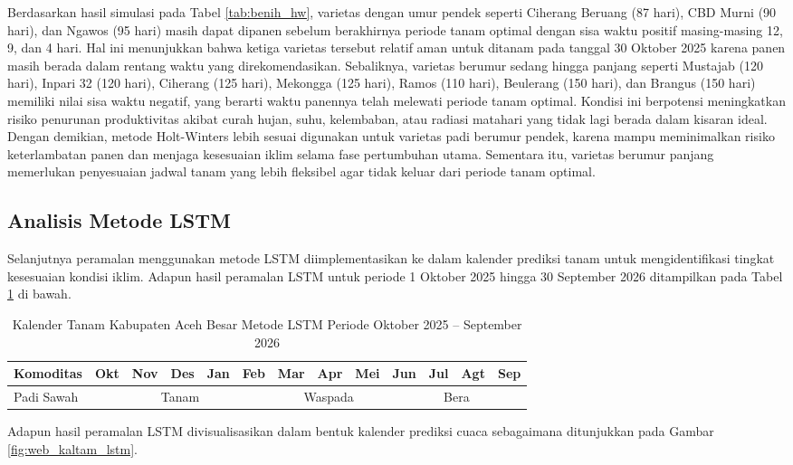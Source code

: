 Berdasarkan hasil simulasi pada Tabel \ref{tab:benih_hw}, varietas dengan umur pendek seperti Ciherang Beruang (87 hari), CBD Murni (90 hari), dan Ngawos (95 hari) masih dapat dipanen sebelum berakhirnya periode tanam optimal dengan sisa waktu positif masing-masing 12, 9, dan 4 hari. Hal ini menunjukkan bahwa ketiga varietas tersebut relatif aman untuk ditanam pada tanggal 30 Oktober 2025 karena panen masih berada dalam rentang waktu yang direkomendasikan. 
Sebaliknya, varietas berumur sedang hingga panjang seperti Mustajab (120 hari), Inpari 32 (120 hari), Ciherang (125 hari), Mekongga (125 hari), Ramos (110 hari), Beulerang (150 hari), dan Brangus (150 hari) memiliki nilai sisa waktu negatif, yang berarti waktu panennya telah melewati periode tanam optimal. Kondisi ini berpotensi meningkatkan risiko penurunan produktivitas akibat curah hujan, suhu, kelembaban, atau radiasi matahari yang tidak lagi berada dalam kisaran ideal. 
Dengan demikian, metode Holt-Winters lebih sesuai digunakan untuk varietas padi berumur pendek, karena mampu meminimalkan risiko keterlambatan panen dan menjaga kesesuaian iklim selama fase pertumbuhan utama. Sementara itu, varietas berumur panjang memerlukan penyesuaian jadwal tanam yang lebih fleksibel agar tidak keluar dari periode tanam optimal.

\subsection{Analisis Metode LSTM}
Selanjutnya peramalan menggunakan metode LSTM diimplementasikan ke dalam kalender prediksi tanam untuk mengidentifikasi tingkat kesesuaian kondisi iklim. Adapun hasil peramalan LSTM untuk periode 1 Oktober 2025 hingga 30 September 2026 ditampilkan pada Tabel \ref{tab:kaltam_lstm} di bawah.
\begin{table}[H]
    \centering
    \caption{Kalender Tanam Kabupaten Aceh Besar Metode LSTM Periode Oktober 2025 -- September 2026}
    \label{tab:kaltam_lstm}
    \scriptsize
    \renewcommand{\arraystretch}{1.3}
    \setlength{\tabcolsep}{6pt}
    \begin{tabular}{|l|c|c|c|c|c|c|c|c|c|c|c|c|}
        \hline
        \textbf{Komoditas} & \textbf{Okt} & \textbf{Nov} & \textbf{Des} & \textbf{Jan} & \textbf{Feb} & \textbf{Mar} & \textbf{Apr} & \textbf{Mei} & \textbf{Jun} & \textbf{Jul} & \textbf{Agt} & \textbf{Sep} \\
        \hline
        Padi Sawah
        & \multicolumn{5}{c|}{\cellcolor{green!25}Tanam}
        & \multicolumn{3}{c|}{\cellcolor{yellow!30}Waspada}
        & \multicolumn{4}{c|}{\cellcolor{red!30}Bera}
        \\
        \hline
    \end{tabular}
\end{table}
Adapun hasil peramalan LSTM divisualisasikan dalam bentuk kalender prediksi cuaca sebagaimana ditunjukkan pada Gambar \ref{fig:web_kaltam_lstm}.

